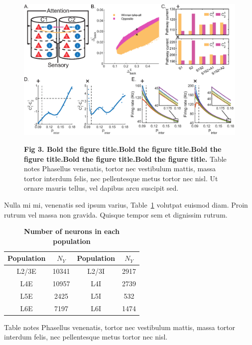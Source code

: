 \documentclass[10pt,letterpaper]{article}
\begin{document}
\begin{figure}[!h]
\begin{adjustwidth}{-2in}{0.3in} %
\centering
\includegraphics{Figure3.eps}
\begin{flushleft} {\bf Fig 3. Bold the figure title.Bold the figure title.Bold the figure title.Bold the figure title.Bold the figure title.}
Table notes Phasellus venenatis, tortor nec vestibulum mattis, massa tortor interdum felis, nec pellentesque metus tortor nec nisl. Ut ornare mauris tellus, vel dapibus arcu suscipit sed.
\end{flushleft}
\hypertarget{fig:fig3}{}
\end{adjustwidth}
\end{figure}

Nulla mi mi, venenatis sed ipsum varius, Table~\ref{table1} volutpat euismod diam. Proin rutrum vel massa non gravida. Quisque tempor sem et dignissim rutrum. 

\begin{table}[!ht]
\centering
\caption{
{\bf Number of neurons in each population}}
\begin{tabular}[t]{cccc}
\toprule
Population & $N_{Y}$ & Population & $N_{Y}$\\
\midrule
L2/3E & 10341 & L2/3I & 2917 \\
L4E & 10957 & L4I & 2739 \\
L5E & 2425 & L5I & 532 \\
L6E & 7197 & L6I & 1474 \\
\bottomrule
\end{tabular}
\begin{flushleft} Table notes Phasellus venenatis, tortor nec vestibulum mattis, massa tortor interdum felis, nec pellentesque metus tortor nec nisl. 
\end{flushleft}
\label{table1}
\end{table}
\end{document}
